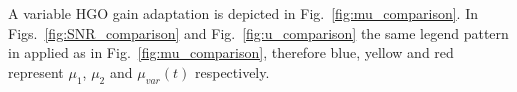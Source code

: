 \documentclass[letterpaper, 10 pt, conference]{ieeeconf}  %
\theoremstyle{plain}
\theoremstyle{definition}
\theoremstyle{remark}
\begin{document}

A variable HGO gain adaptation is depicted in Fig.~\ref{fig:mu_comparison}. In Figs.~\ref{fig:SNR_comparison} and Fig.~\ref{fig:u_comparison} the same legend pattern in applied as in Fig.~\ref{fig:mu_comparison}, therefore blue, yellow and red represent $\mu_{1}$, $\mu_{2}$ and $\mu_{var}(t)$ respectively.
\end{document}
